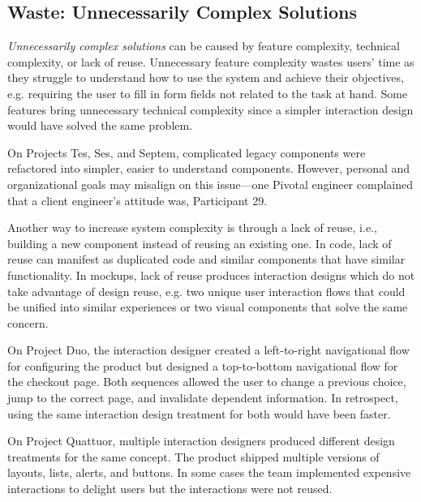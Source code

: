\subsection{Waste: Unnecessarily Complex Solutions}
\textit{Unnecessarily complex solutions} can be caused by feature complexity, technical complexity, or lack of reuse. Unnecessary feature complexity wastes users' time as they struggle to understand how to use the system and achieve their objectives, e.g. requiring the user to fill in form fields not related to the task at hand. Some features bring unnecessary technical complexity since a simpler interaction design would have solved the same problem. %

On Projects Tes, Ses, and Septem, complicated legacy components were refactored into simpler, easier to understand components. However, personal and organizational goals may misalign on this issue---one Pivotal engineer complained that a client engineer's attitude was,  \textemdash Participant 29.

Another way to increase system complexity is through a lack of reuse, i.e., building a new component instead of reusing an existing one. In code, lack of reuse can manifest as duplicated code and similar components that have similar functionality. In mockups, lack of reuse produces  interaction designs which do not take advantage of design reuse, e.g. two unique user interaction flows that could be unified into similar experiences or two visual components that solve the same concern.

On Project Duo, the interaction designer created a left-to-right navigational flow for configuring the product but designed a top-to-bottom navigational flow for the checkout page. Both sequences allowed the user to change a previous choice, jump to the correct page, and invalidate dependent information. In retrospect, using the same interaction design treatment for both would have been faster. 

On Project Quattuor, multiple interaction designers produced different design treatments for the same concept. The product shipped multiple versions of layouts, lists, alerts, and buttons. In some cases the team implemented expensive interactions to delight users but the interactions were not reused. 

